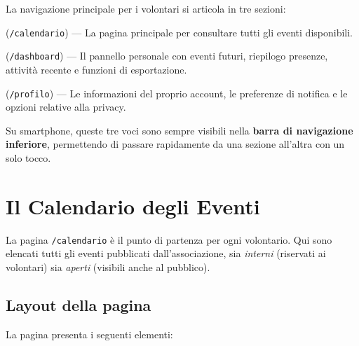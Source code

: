 \documentclass[a4paper,11pt,oneside]{book}
\newcommand{\menuitem}[1]{\textsf{\textbf{#1}}}
\newcommand{\percorso}[1]{\textcolor{namoCyan}{\texttt{#1}}}
\begin{document}
La navigazione principale per i volontari si articola in tre sezioni:

\begin{description}[leftmargin=1.5em, style=nextline]
  \item[\menuitem{CALENDARIO}] (\percorso{/calendario}) --- La pagina principale per consultare tutti gli eventi disponibili.
  \item[\menuitem{DASHBOARD}] (\percorso{/dashboard}) --- Il pannello personale con eventi futuri, riepilogo presenze, attivit\`a recente e funzioni di esportazione.
  \item[\menuitem{PROFILO}] (\percorso{/profilo}) --- Le informazioni del proprio account, le preferenze di notifica e le opzioni relative alla privacy.
\end{description}

\begin{tipbox}
Su smartphone, queste tre voci sono sempre visibili nella \textbf{barra di navigazione inferiore}, permettendo di passare rapidamente da una sezione all'altra con un solo tocco.
\end{tipbox}

\section{Il Calendario degli Eventi}
\label{sec:calendario-eventi}

La pagina \percorso{/calendario} \`e il punto di partenza per ogni volontario. Qui sono elencati tutti gli eventi pubblicati dall'associazione, sia \textit{interni} (riservati ai volontari) sia \textit{aperti} (visibili anche al pubblico).

\subsection{Layout della pagina}

La pagina presenta i seguenti elementi:
\end{document}
